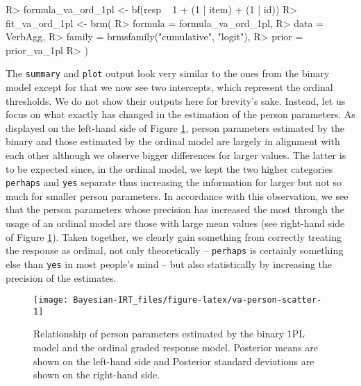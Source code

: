 \documentclass[jss]{jss}
\begin{document}
\begin{CodeChunk}

\begin{CodeInput}
R> formula_va_ord_1pl <- bf(resp ~ 1 + (1 | item) + (1 | id))
R> fit_va_ord_1pl <- brm(
R>   formula = formula_va_ord_1pl,
R>   data = VerbAgg,
R>   family = brmsfamily("cumulative", "logit"),
R>   prior = prior_va_1pl
R> )
\end{CodeInput}
\end{CodeChunk}

The \texttt{summary} and \texttt{plot} output look very similar to the
ones from the binary model except for that we now see two intercepts,
which represent the ordinal thresholds. We do not show their outputs
here for brevity's sake. Instead, let us focus on what exactly has
changed in the estimation of the person parameters. As displayed on the
left-hand side of Figure \ref{fig:va-person-scatter}, person parameters
estimated by the binary and those estimated by the ordinal model are
largely in alignment with each other although we observe bigger
differences for larger values. The latter is to be expected since, in
the ordinal model, we kept the two higher categories \texttt{perhaps}
and \texttt{yes} separate thus increasing the information for larger but
not so much for smaller person parameters. In accordance with this
observation, we see that the person parameters whose precision has
increased the most through the usage of an ordinal model are those with
large mean values (see right-hand side of Figure
\ref{fig:va-person-scatter}). Taken together, we clearly gain something
from correctly treating the response as ordinal, not only theoretically
-- \texttt{perhaps} is certainly something else than \texttt{yes} in
most people's mind -- but also statistically by increasing the precision
of the estimates.

\begin{CodeChunk}
\begin{figure}

{\centering \texttt{[image: Bayesian-IRT\_files/figure-latex/va-person-scatter-1]} 

}

\caption[Relationship of person parameters estimated by the binary 1PL model and the ordinal graded response model]{Relationship of person parameters estimated by the binary 1PL model and the ordinal graded response model. Posterior means are shown on the left-hand side and Posterior standard deviations are shown on the right-hand side.}\label{fig:va-person-scatter}
\end{figure}
\end{CodeChunk}
\end{document}

